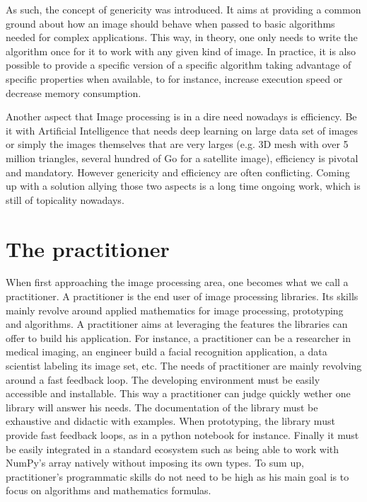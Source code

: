 As such, the concept of genericity was introduced. It aims at providing a common ground about how an image should behave
when passed to basic algorithms needed for complex applications. This way, in theory, one only needs to write the
algorithm once for it to work with any given kind of image. In practice, it is also possible to provide a specific
version of a specific algorithm taking advantage of specific properties when available, to for instance, increase
execution speed or decrease memory consumption.

Another aspect that Image processing is in a dire need nowadays is efficiency. Be it with Artificial Intelligence that
needs deep learning on large data set of images or simply the images themselves that are very larges (e.g. 3D mesh with
over 5 million triangles, several hundred of Go for a satellite image), efficiency is pivotal and mandatory. However
genericity and efficiency are often conflicting. Coming up with a solution allying those two aspects is a long time
ongoing work, which is still of topicality nowadays.



\section{The practitioner}

When first approaching the image processing area, one becomes what we call a practitioner. A practitioner is the end
user of image processing libraries. Its skills mainly revolve around applied mathematics for image processing,
prototyping and algorithms. A practitioner aims at leveraging the features the libraries can offer to build his
application. For instance, a practitioner can be a researcher in medical imaging, an engineer build a facial recognition
application, a data scientist labeling its image set, etc. The needs of practitioner are mainly revolving around a fast
feedback loop. The developing environment must be easily accessible and installable. This way a practitioner can judge
quickly wether one library will answer his needs. The documentation of the library must be exhaustive and didactic with
examples. When prototyping, the library must provide fast feedback loops, as in a python notebook for instance. Finally
it must be easily integrated in a standard ecosystem such as being able to work with NumPy's array natively without
imposing its own types. To sum up, practitioner's programmatic skills do not need to be high as his main goal is to
focus on algorithms and mathematics formulas.


